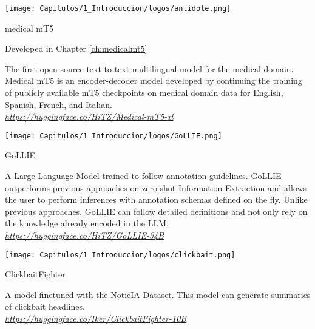 \begin{resources}
    {
    \begin{adjustbox}{valign=c}
    \texttt{[image: Capitulos/1\_Introduccion/logos/antidote.png]}
    \end{adjustbox}
    \begin{adjustbox}{valign=c}
    \begin{minipage}{\textwidth}
    medical mT5
    \end{minipage}
    \end{adjustbox}
    }
    \begin{resourcessmall}
    Developed in Chapter \ref{ch:medicalmt5}
    \end{resourcessmall}
    The first open-source text-to-text multilingual model for the medical domain. Medical mT5 is an encoder-decoder model developed by continuing the training of publicly available mT5 checkpoints on medical domain data for English, Spanish, French, and Italian.  \\
    \textit{\href{https://huggingface.co/HiTZ/Medical-mT5-xl}{https://huggingface.co/HiTZ/Medical-mT5-xl}}
\end{resources}
\clearpage
\begin{resources}
    {
    \begin{adjustbox}{valign=c}
    \texttt{[image: Capitulos/1\_Introduccion/logos/GoLLIE.png]}
    \end{adjustbox}
    \begin{adjustbox}{valign=c}
    \begin{minipage}{\textwidth}
    GoLLIE
    \end{minipage}
    \end{adjustbox}
    }
    A Large Language Model trained to follow annotation guidelines. GoLLIE outperforms previous approaches on zero-shot Information Extraction and allows the user to perform inferences with annotation schemas defined on the fly. Unlike previous approaches, GoLLIE can follow detailed definitions and not only rely on the knowledge already encoded in the LLM. \\
    \textit{\href{https://huggingface.co/HiTZ/GoLLIE-34B}{https://huggingface.co/HiTZ/GoLLIE-34B}}
\end{resources}

\begin{resources}
    {
    \begin{adjustbox}{valign=c}
    \texttt{[image: Capitulos/1\_Introduccion/logos/clickbait.png]}
    \end{adjustbox}
    \begin{adjustbox}{valign=c}
    \begin{minipage}{\textwidth}
    ClickbaitFighter
    \end{minipage}
    \end{adjustbox}
    }
    A model finetuned with the NoticIA Dataset. This model can generate summaries of clickbait headlines. \\
    \textit{\href{https://huggingface.co/Iker/ClickbaitFighter-10B}{https://huggingface.co/Iker/ClickbaitFighter-10B}}
\end{resources}